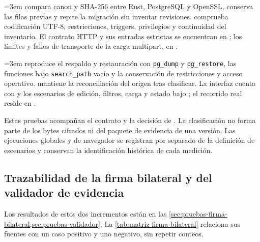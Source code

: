 {\emergencystretch=3em  compara canon y SHA-256 entre Rust, PostgreSQL y OpenSSL, conserva las filas previas y repite la migración sin inventar revisiones.  comprueba codificación UTF-8, restricciones, triggers, privilegios y continuidad del inventario. El contrato HTTP y sus entradas estrictas se encuentran en ; los límites y fallos de transporte de la carga multipart, en .\par}

{\emergencystretch=3em  reproduce el respaldo y restauración con \texttt{pg\_dump} y \texttt{pg\_restore}, las funciones bajo \texttt{search\_path} vacío y la conservación de restricciones y acceso operativo.  mantiene la reconciliación del origen tras clasificar. La interfaz cuenta con  y los escenarios de edición, filtros, carga y estado bajo ; el recorrido real reside en .\par}

Estas pruebas acompañan el contrato y la decisión de . La clasificación no forma parte de los bytes cifrados ni del paquete de evidencia de una versión. Las ejecuciones globales y de navegador se registran por separado de la definición de escenarios y conservan la identificación histórica de cada medición.





\subsection{Trazabilidad de la firma bilateral y del validador de evidencia}\label{sec:matriz-firma-bilateral}

Los resultados de estos dos incrementos están en las \cref{sec:pruebas-firma-bilateral,sec:pruebas-validador}. La \cref{tab:matriz-firma-bilateral} relaciona sus fuentes con un caso positivo y uno negativo, sin repetir conteos.

